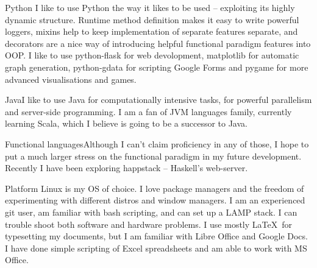 \documentclass{tccv}
\begin{document}
\begin{skillist}

\item{Python}
     {I like to use Python the way it likes to be used -- exploiting its highly dynamic structure. Runtime method definition makes it easy to write powerful loggers, mixins help to keep implementation of separate features separate, and decorators are a nice way of introducing helpful functional paradigm features into OOP. I like to use python-flask for web devolopment, matplotlib for automatic graph generation, python-gdata for scripting Google Forms and pygame for more advanced visualisations and games.}
\item{Java}{I like to use Java for computationally intensive tasks, for powerful parallelism and server-side programming. I am a fan of JVM languages family, currently learning Scala, which I believe is going to be a successor to Java.}
\item{Functional languages}{Although I can't claim proficiency in any of those, I hope to put a much larger stress on the functional paradigm in my future development. Recently I have been exploring happstack -- Haskell's web-server.}
\item{Platform}
     {Linux is my OS of choice. I love package managers and the freedom of experimenting with different distros and window managers. I am an experienced git user, am familiar with bash scripting, and can set up a LAMP stack. I can trouble shoot both software and hardware problems. I use mostly \LaTeX \ for typesetting my documents, but I am familiar with Libre Office and Google Docs. I have done simple scripting of Excel spreadsheets and am able to work with MS Office.}
\end{skillist}
\end{document}
